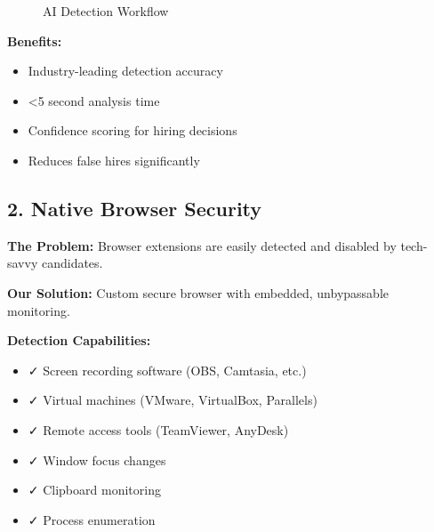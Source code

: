 \documentclass[11pt,letterpaper]{article}
\begin{document}
\begin{figure}[H]
\centering
{}
\caption{AI Detection Workflow}
\end{figure}

\textbf{Benefits:}
\begin{itemize}[noitemsep]
    \item Industry-leading detection accuracy
    \item <5 second analysis time
    \item Confidence scoring for hiring decisions
    \item Reduces false hires significantly
\end{itemize}

\subsection{2. Native Browser Security}

\textbf{The Problem:} Browser extensions are easily detected and disabled by tech-savvy candidates.

\textbf{Our Solution:} Custom secure browser with embedded, unbypassable monitoring.

\textbf{Detection Capabilities:}
\begin{itemize}[noitemsep]
    \item ✓ Screen recording software (OBS, Camtasia, etc.)
    \item ✓ Virtual machines (VMware, VirtualBox, Parallels)
    \item ✓ Remote access tools (TeamViewer, AnyDesk)
    \item ✓ Window focus changes
    \item ✓ Clipboard monitoring
    \item ✓ Process enumeration
\end{itemize}
\end{document}
